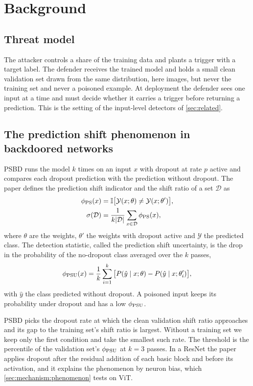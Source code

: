 \section{Background}
\label{sec:background}

\subsection{Threat model}
The attacker controls a share of the training data and plants a trigger with a target label. The defender receives the trained model and holds a small clean validation set drawn from the same distribution, here \HeldoutSize{} images, but never the training set and never a poisoned example. At deployment the defender sees one input at a time and must decide whether it carries a trigger before returning a prediction. This is the setting of the input-level detectors of \cref{sec:related}.

\subsection{The prediction shift phenomenon in backdoored networks}
PSBD \cite{li2025psbd} runs the model $k$ times on an input $x$ with dropout at rate $p$ active and compares each dropout prediction with the prediction without dropout. The paper defines the prediction shift indicator and the shift ratio of a set $\mathcal{D}$ as
\begin{equation}
  \begin{split}
    \phi_{\mathrm{PS}}(x) &= \mathbb{I}\big[\mathcal{Y}(x;\theta) \neq \mathcal{Y}(x;\theta')\big], \\
    \sigma(\mathcal{D}) &= \frac{1}{k|\mathcal{D}|}\sum_{x\in\mathcal{D}} \phi_{\mathrm{PS}}(x),
  \end{split}
\end{equation}
where $\theta$ are the weights, $\theta'$ the weights with dropout active and $\mathcal{Y}$ the predicted class. The detection statistic, called the prediction shift uncertainty, is the drop in the probability of the no-dropout class averaged over the $k$ passes,
\begin{equation}
  \phi_{\mathrm{PSU}}(x) = \frac{1}{k}\sum_{i=1}^{k}
    \big[ P(\hat y \mid x;\theta) - P(\hat y \mid x;\theta'_i) \big],
\end{equation}
with $\hat y$ the class predicted without dropout. A poisoned input keeps its probability under dropout and has a low $\phi_{\mathrm{PSU}}$.

PSBD picks the dropout rate at which the clean validation shift ratio approaches \AdaptiveShiftTarget{} and its gap to the training set's shift ratio is largest. Without a training set we keep only the first condition and take the smallest such rate. The threshold is the \HeadlineQuantilePercent{} percentile of the validation set's $\phi_{\mathrm{PSU}}$ at $k = 3$ passes. In a ResNet the paper applies dropout after the residual addition of each basic block and before its activation, and it explains the phenomenon by neuron bias, which \cref{sec:mechanism:phenomenon} tests on ViT.

